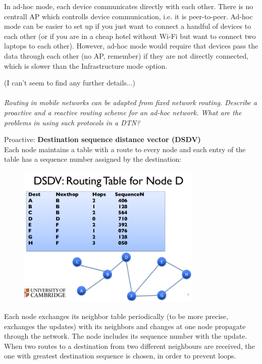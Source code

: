 \documentclass[12pt]{article}
\newcommand*\circled[1]{\tikz[baseline=(char.base)]{
		\node[shape=circle,draw,inner sep=0pt] (char) {#1};}}
\begin{document}
In ad-hoc mode, each device communicates directly with each other. There is no
centrall AP which controlls device communication, i.e. it is peer-to-peer.
Ad-hoc mode can be easier to set up if you just want to connect a handful of
devices to each other (or if you are in a cheap hotel without Wi-Fi but want to
connect two laptops to each other). However, ad-hoc mode would require that
devices pass the data through each other (no AP, remember) if they are not
directly connected, which is slower than the Infrastructure mode option.

(I can't seem to find any further details...)
\\
\\
\textit{\circled{5.} Routing in mobile networks can be adapted from fixed
network routing. Describe a proactive and a reactive routing scheme for an
ad-hoc network. What are the problems in using such protocols in a DTN?}

Proactive: \textbf{Destination sequence distance vector (DSDV)}\\
Each node maintains a table with a route to every node and each entry of the
table has a sequence number assigned by the destination:
\begin{figure}[H]
    \centering
    \includegraphics[width=250pt]{dsdv_table.png}
\end{figure}
Each node exchanges its neighbor table periodically (to be more precise,
exchanges the updates) with its neighbors and changes at one node propagate
through the network. The node includes its sequence number with the update.
When two routes to a destination from two different neighbours are received,
the one with greatest destination sequence is chosen, in order to prevent
loops.
\end{document}
